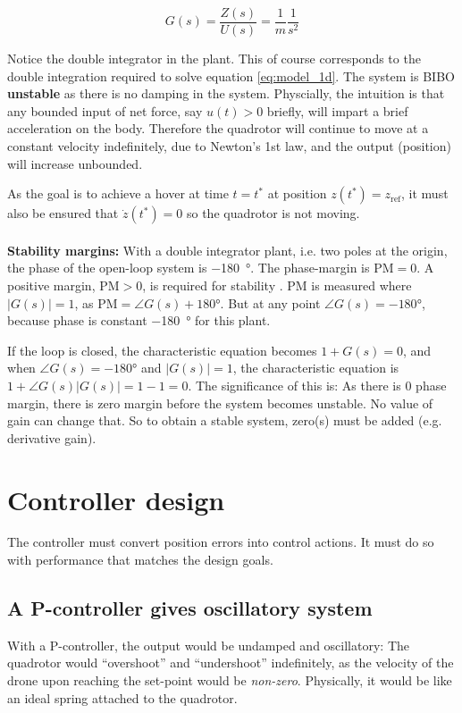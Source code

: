 \documentclass[a4paper]{report}
\begin{document}
\begin{equation} \label{eq:model_1d_tf}
G(s) = \frac{Z(s)}{U(s)} = \frac{1}{m} \frac{1}{s^2}
\end{equation}

Notice the double integrator in the plant. This of course corresponds to the double integration required to solve equation \ref{eq:model_1d}. The system is \gls{BIBO} \textbf{unstable} as there is no damping in the system. Physcially, the intuition is that any bounded input of net force, say $u(t)>0$ briefly, will impart a brief acceleration on the body. Therefore the quadrotor will continue to move at a constant velocity indefinitely, due to Newton's 1st law, and the output (position) will increase unbounded.

As the goal is to achieve a hover at time $t=t^*$ at position $z(t^*)=z_\text{ref}$, it must also be ensured that $\dot{z}(t^*)=0$ so the quadrotor is not moving. \\ \\

\textbf{Stability margins:}
With a double integrator plant, i.e. two poles at the origin, the phase of the open-loop system is \SI{-180}{\degree}. The phase-margin is $\text{PM}=0$.
A positive margin, $\text{PM}>0$, is required for stability \cite[p. 349]{franklin}.
$\text{PM}$ is measured where $|G(s)|=1$, as $\text{PM} = \angle G(s) + 180°$. But at any point $\angle G(s) = -180°$, because phase is constant \SI{-180}{\degree} for this plant.

If the loop is closed, the characteristic equation becomes $1+G(s)=0$, and
when $\angle G(s) = -180°$ and $|G(s)|=1$, the characteristic equation is $1+\angle G(s)|G(s)| = 1-1 = 0$.
The significance of this is: As there is $0$ phase margin, there is zero margin before the system becomes unstable. 
No value of gain can change that.
So to obtain a stable system, zero(s) must be added (e.g. derivative gain).


\section{Controller design}

The controller must convert position errors into control actions. It must do so with performance that matches the design goals.

\subsection{A P-controller gives oscillatory system}
With a P-controller, the output would be undamped and oscillatory: The quadrotor would ``overshoot'' and ``undershoot'' indefinitely, as the velocity of the drone upon reaching the set-point would be \textit{non-zero}.  Physically, it would be like an ideal spring attached to the quadrotor.
\end{document}

